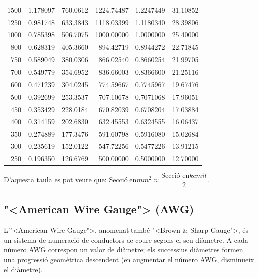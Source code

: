 \begin{longtable}{r<{\hspace{0.6em}}rrrrr}
1500 &   \num{1,178097} &   \num{760,0612}  & \num{1224,74487} &  \num{1,2247449} &   \num{31,10852} \\
1250 &   \num{0,981748} &   \num{633,3843}  & \num{1118,03399} &  \num{1,1180340} &   \num{28,39806} \\
1000 &   \num{0,785398} &   \num{506,7075}  & \num{1000,00000} &  \num{1,0000000} &   \num{25,40000} \\
 800 &   \num{0,628319} &   \num{405,3660}  & \num{ 894,42719} &  \num{0,8944272} &   \num{22,71845} \\
 750 &   \num{0,589049} &   \num{380,0306}  & \num{ 866,02540} &  \num{0,8660254} &   \num{21,99705} \\
 700 &   \num{0,549779} &   \num{354,6952}  & \num{ 836,66003} &  \num{0,8366600} &   \num{21,25116} \\
 600 &   \num{0,471239} &   \num{304,0245}  & \num{ 774,59667} &  \num{0,7745967} &   \num{19,67476} \\
 500 &   \num{0,392699} &   \num{253,3537}  & \num{ 707,10678} &  \num{0,7071068} &   \num{17,96051} \\
 450 &   \num{0,353429} &   \num{228,0184}  & \num{ 670,82039} &  \num{0,6708204} &   \num{17,03884} \\
 400 &   \num{0,314159} &   \num{202,6830}  & \num{ 632,45553} &  \num{0,6324555} &   \num{16,06437} \\
 350 &   \num{0,274889} &   \num{177,3476}  & \num{ 591,60798} &  \num{0,5916080} &   \num{15,02684} \\
 300 &   \num{0,235619} &   \num{152,0122}  & \num{ 547,72256} &  \num{0,5477226} &   \num{13,91215} \\
 250 &   \num{0,196350} &   \num{126,6769}  & \num{ 500,00000} &  \num{0,5000000} &   \num{12,70000} \\
\bottomrule[1pt]
\end{longtable}

D'aquesta taula es pot veure que: $\text{Secci\'{o} en}\unit{mm^2} \approx \dfrac{\text{Secci\'{o} en}\unit{kcmil}}{2}$.


\subsection{{"<}American Wire Gauge{">} (AWG)}

L'{"<}American Wire Gauge{">}, anomenat tamb\'{e} {"<}Brown \& Sharp Gauge{">}, \'{e}s un sistema de numeraci\'{o} de conductors de coure segons el seu di\`{a}metre. A cada n\'{u}mero AWG correspon un valor de di\`{a}metre; els successius di\`{a}metres formen una progressi\'{o} geom\`{e}trica descendent (en augmentar el n\'{u}mero AWG, disminueix el di\`{a}metre).

